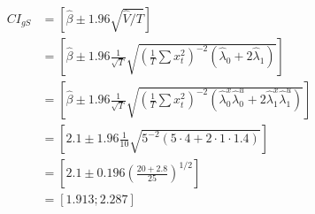 {{\begin{enumerate}[label=(\alph*)]
{$$
\begin{aligned}
C I_{g S} & =[\hat{\beta} \pm 1.96 \sqrt{\hat{V} / T}] \\
& =\left[\hat{\beta} \pm 1.96 \frac{1}{\sqrt{T}} \sqrt{\left(\frac{1}{T} \sum x_{t}^{2}\right)^{-2}\left(\hat{\lambda}_{0}+2 \hat{\lambda}_{1}\right)}\right] \\
& =\left[\hat{\beta} \pm 1.96 \frac{1}{\sqrt{T}} \sqrt{\left(\frac{1}{T} \sum x_{t}^{2}\right)^{-2}\left(\hat{\lambda}_{0}^{x} \hat{\lambda}_{0}^{u}+2 \hat{\lambda}_{1}^{x} \hat{\lambda}_{1}^{u}\right)}\right] \\
& =\left[2.1 \pm 1.96 \frac{1}{10} \sqrt{5^{-2}(5 \cdot 4+2 \cdot 1 \cdot 1.4)}\right] \\
& =\left[2.1 \pm 0.196\left(\frac{20+2.8}{25}\right)^{1 / 2}\right] \\
& =[1.913 ; 2.287]
\end{aligned}
$$
}
\end{enumerate}
}
}

